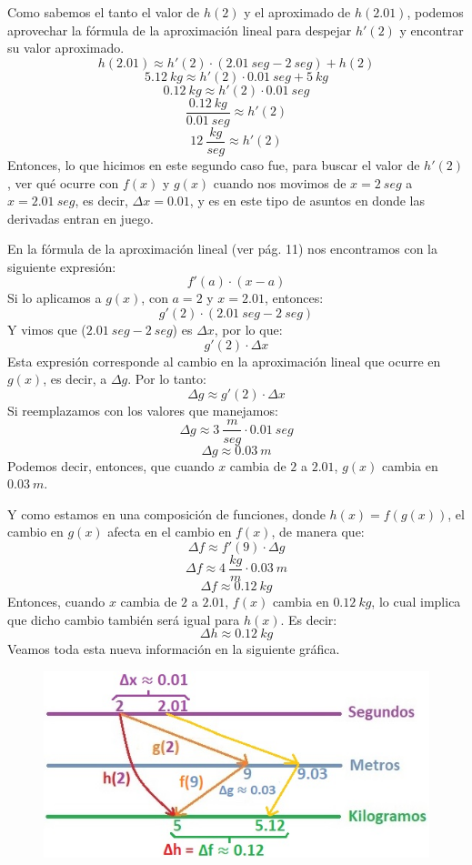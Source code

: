 \documentclass[12pt]{article}
\begin{document}
Como sabemos el tanto el valor de $h(2)$ y el aproximado de $h(2.01)$, podemos aprovechar la fórmula de la aproximación lineal para despejar $h'(2)$ y encontrar su valor aproximado.
\[h(2.01) \approx h'(2) \cdot (2.01 \ seg - 2 \ seg) + h(2)\]
\[5.12 \ kg \approx h'(2) \cdot 0.01 \ seg + 5 \ kg\]
\[0.12 \ kg \approx h'(2) \cdot 0.01 \ seg\]
\[\frac{0.12 \ kg}{0.01 \ seg} \approx h'(2)\]
\[12 \ \frac{kg}{seg} \approx h'(2)\]
Entonces, lo que hicimos en este segundo caso fue, para buscar el valor de $h'(2)$, ver qué ocurre con $f(x)$ y $g(x)$ cuando nos movimos de $x = 2 \ seg$ a $x = 2.01 \ seg$, es decir, $\Delta x = 0.01$, y es en este tipo de asuntos en donde las derivadas entran en juego.

En la fórmula de la aproximación lineal (ver pág. 11) nos encontramos con la siguiente expresión:
\[f'(a) \cdot (x - a)\]
Si lo aplicamos a $g(x)$, con $a = 2$ y $x = 2.01$, entonces:
\[g'(2) \cdot (2.01 \ seg - 2 \ seg)\]
Y vimos que ($2.01 \ seg - 2 \ seg$) es $\Delta x$, por lo que:
\[g'(2) \cdot \Delta x\]
Esta expresión corresponde al cambio en la aproximación lineal que ocurre en $g(x)$, es decir, a $\Delta g$. Por lo tanto:
\[\Delta g \approx g'(2) \cdot \Delta x\]
Si reemplazamos con los valores que manejamos:
\[\Delta g \approx 3 \ \frac{m}{seg} \cdot 0.01 \ seg\]
\[\Delta g \approx 0.03 \ m\]
Podemos decir, entonces, que cuando $x$ cambia de $2$ a $2.01$, $g(x)$ cambia en $0.03 \ m$.

Y como estamos en una composición de funciones, donde $h(x) = f(g(x))$, el cambio en $g(x)$ afecta en el cambio en $f(x)$, de manera que:
\[\Delta f \approx f'(9) \cdot \Delta g\]
\[\Delta f \approx 4 \ \frac{kg}{m} \cdot 0.03 \ m\]
\[\Delta f \approx 0.12 \ kg\]
Entonces, cuando $x$ cambia de $2$ a $2.01$, $f(x)$ cambia en $0.12 \ kg$, lo cual implica que dicho cambio también será igual para $h(x)$. Es decir:
\[\Delta h \approx 0.12 \ kg\]
Veamos toda esta nueva información en la siguiente gráfica.

\begin{figure}[hbt!]
\centering
\includegraphics[scale=0.7]{img/intro-chain-rule-2.jpg}
\end{figure}
\end{document}
